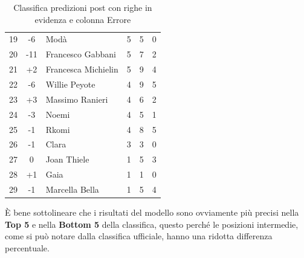 \documentclass[a4paper,12pt]{article}
\begin{document}
\begin{table}[H]
{\begin{tabular}{c c l c c c}
    \rowcolor{rossochiaro}  19 & -6 & Modà                        & 5  & 5  & 0  \\
    \rowcolor{rossochiaro}  20 & -11 & Francesco Gabbani           & 5  & 7  & 2  \\
    \rowcolor{rossochiaro}  21 & +2 & Francesca Michielin         & 5  & 9  & 4  \\
    \rowcolor{rossochiaro}  22 & -6 & Willie Peyote               & 4  & 9  & 5  \\
    \rowcolor{rossochiaro}  23 & +3 & Massimo Ranieri             & 4  & 6  & 2  \\
    \rowcolor{rossochiaro}  24 & -3 & Noemi                       & 4  & 5  & 1  \\
    \rowcolor{rossochiaro}  25 & -1 & Rkomi                       & 4  & 8  & 5  \\
    \rowcolor{rossochiaro}  26 & -1 & Clara                       & 3  & 3  & 0  \\
    \rowcolor{verdechiaro}  27 & 0 & Joan Thiele                 & 1  & 5  & 3  \\
    \rowcolor{rossochiaro}  28 & +1 & Gaia                        & 1  & 1  & 0  \\
    \rowcolor{rossochiaro}  29 & -1 & Marcella Bella              & 1  & 5  & 4  \\
    \bottomrule
  \end{tabular}
  } %
  \caption{Classifica predizioni post con righe in evidenza e colonna Errore}
  \label{tab:predizioni_post_ultima_serata_evidenza}
\end{table}


È bene sottolineare che i risultati del modello sono ovviamente più precisi nella \textbf{Top 5} e nella \textbf{Bottom 5} della classifica, questo perché le posizioni intermedie, come si può notare dalla classifica ufficiale, hanno una ridotta differenza percentuale.
\end{document}
